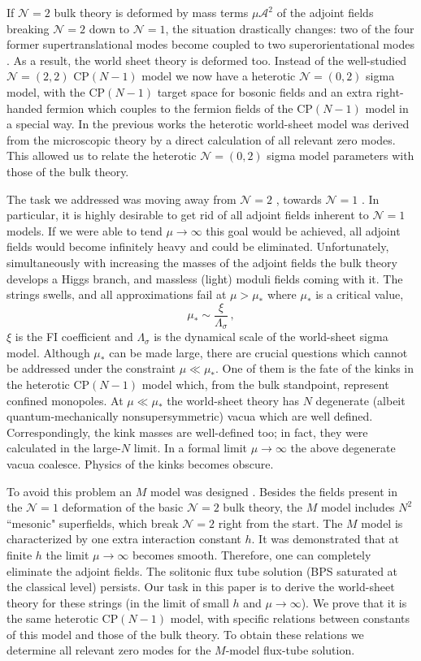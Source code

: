 \documentclass[12pt]{article}
\def\beq{\begin{equation}}
\def\eeq{\end{equation}}
\newcommand{\ntwo}{${\mathcal N}=2$ }
\newcommand{\ntwoo}{${\mathcal N}= \left(0,2\right) $ }
\newcommand{\none}{${\mathcal N}=1$ }
\newcommand{\nonen}{${\mathcal N}=1$}
\begin{document}
If \ntwo bulk theory is deformed by mass terms $\mu{\mathcal A}^2$ of the adjoint fields
breaking \ntwo down to \nonen, the situation drastically changes:
two of the four former supertranslational modes
become coupled to two superorientational modes \cite{Edalati}.
As a result, the world sheet theory is deformed too.
Instead of the well-studied ${\mathcal N}=(2,2)$ CP$(N-1)$ model we now have
a heterotic \ntwoo 
sigma model, with the CP$(N-1)$ target space for bosonic fields and an extra 
right-handed fermion which couples to the fermion fields of the
CP$(N-1)$ model in a special way. In the previous works \cite{SYhet,BSYhet}
the heterotic world-sheet model was derived from the microscopic theory by
a direct calculation of all relevant zero modes.
This allowed us 
to relate the  heterotic \ntwoo 
sigma model parameters with those of the bulk theory.

The task we addressed was moving away from \ntwo$\!\!$, towards \none$\!\!$.
In particular, it is highly desirable to get rid of all adjoint fields
inherent to \none models.  If we were able to tend $\mu\to\infty$ this goal would be achieved,
all adjoint fields would become infinitely heavy and could be eliminated. Unfortunately,
simultaneously with increasing the masses of the adjoint fields the bulk theory develops 
a Higgs branch, and massless (light) moduli fields coming with it. The strings swells,
and all approximations fail at $\mu >\mu_*$ where $\mu_*$ is a critical value,
\beq
\mu_* \sim \frac{\xi}{\Lambda_\sigma}\,,
\label{critmu}
\eeq
$\xi$ is the FI coefficient and $\Lambda_\sigma$ is the dynamical scale
of the world-sheet sigma model.
Although $\mu_*$ can be made large, there are crucial questions which cannot be addressed
under the constraint $\mu \ll \mu_*$. One of them is the fate of the kinks in the heterotic
CP$(N-1)$ model which, from the bulk standpoint, represent confined monopoles.
At $\mu \ll \mu_*$ the world-sheet theory has $N$ degenerate (albeit quantum-mechanically nonsupersymmetric) vacua
which are well defined. Correspondingly, the kink masses are well-defined too;
in fact, they were calculated \cite{SYhet2} in the large-$N$ limit. In a formal limit $\mu\to\infty$
the above degenerate vacua coalesce. Physics of the kinks becomes obscure.

To avoid this problem an $M$ model was designed \cite{GSYmmodel}. Besides the fields present in the
\none deformation of the basic \ntwo bulk theory, the $M$ model includes $N^2$
``mesonic" superfields, which break \ntwo right from the start. The $M$ model is characterized by one
extra interaction constant $h$. 
It was demonstrated \cite{GSYmmodel} that at finite $h$ the limit $\mu\to\infty$ becomes smooth.
Therefore, one can completely eliminate the adjoint fields.
The solitonic flux tube solution (BPS saturated at the classical level) persists.  
Our task in this paper is to derive the world-sheet theory for these strings (in the limit of
small $h$ and $\mu\to\infty$). We prove that it is the same heterotic
CP$(N-1)$ model, with specific relations between constants of this model and those of the bulk theory.
To obtain these relations we determine all relevant zero modes for the $M$-model flux-tube solution.
\end{document}
